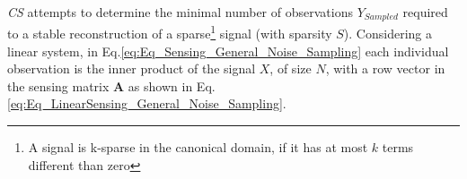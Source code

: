 
\newcommand\dico{\mathbf{\Phi}}
\newcommand\atom{\varphi}
\newcommand\inn[2]{\langle\atom_{#1}, \atom_{#2}\rangle}
\newcommand\ip[2]{\langle #1, #2\rangle}
\newcommand\natoms{K}
\newcommand\sparsity{S}
\newcommand\spacedim{N}
\newcommand\samples{m}
\newcommand\nchans{N}
\newcommand\good{\Lambda}
\newcommand\bad{{\overline{\good}}}
\newcommand\sensing{\mathbf{A}}
\newcommand\satom{\psi}
\newcommand\ident{\mathbf{I}}
\newcommand\Id{\mathbf{I}}
\newcommand\Proj{\mathbf{P}}
\newcommand\Gram{\mathbf{G}}
\newcommand\DX{D} %
\newcommand\coeff{\alpha}
\newcommand\Dynamic{\operatorname{R}}
\newcommand\PSNR{\operatorname{PSNR}}
\newcommand\samesim{\chi}
\newcommand\gwJ{{\good\backslash J}}
\newcommand\eps{{\varepsilon}}
\newcommand\nlevel{{\eta}}
\newcommand\ie{{i.e., }}

\newcommand\Y{Y}
\newcommand\X{X}
\newcommand\U{U}
\newcommand\Err{E}
\newcommand\diag{\textrm{diag}}
\newcommand\B{\mathbf{B}}
\renewcommand{\P}{{\mathbb{P}}}
\newcommand\opnorm[1]{|\!|\!| #1|\!|\!|}

\newcommand{\rec}{{\operatorname{recovery}}}
\newcommand{\nrec}{{\operatorname{not~recovery}}}



\emph{CS} attempts to determine the minimal number of observations $Y_{Sampled}$ required to a stable reconstruction of a sparse\footnote{A signal is k-sparse in the canonical domain, if it has at most $k$ terms different than zero} signal (with sparsity $\sparsity$). Considering a linear system, in Eq.\eqref{eq:Eq_Sensing_General_Noise_Sampling} each individual observation is the inner product of the signal $X$, of size $\spacedim$, with a row vector in the sensing matrix $\mathbf{A}$ as shown in Eq.\eqref{eq:Eq_LinearSensing_General_Noise_Sampling}.

